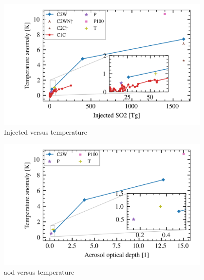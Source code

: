 \documentclass{ametsocV5}
\begin{document}
\begin{figure}
  \begin{center}
    \includegraphics[width=0.95\textwidth]{figures/injection_vs_temperature.png}
  \end{center}
  \caption{Injected  versus temperature}
  \label{fig:so2_vs_temp}
\end{figure}

\begin{figure}
  \begin{center}
    \includegraphics[width=0.95\textwidth]{figures/aod_vs_temperature.png}
  \end{center}
  \caption{\acrshort{aod} versus temperature}
  \label{fig:aod_vs_temp}
\end{figure}
\end{document}

